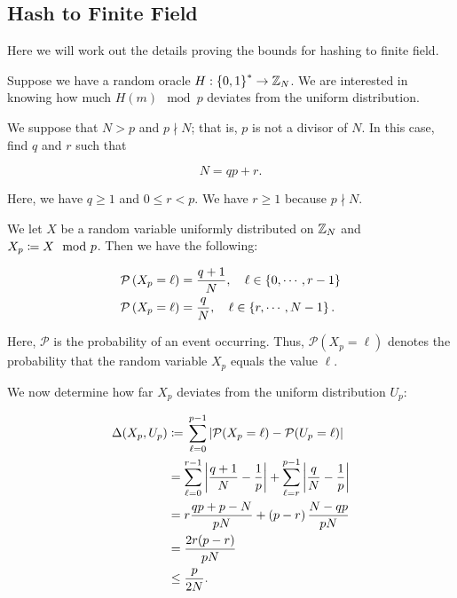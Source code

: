 \subsection{Hash to Finite Field}
\label{app:crypto_hash-to-finite-field}

Here we will work out the details proving the bounds for hashing
to \gls{finite field}.

Suppose we have a \gls{random oracle} $H:\left\{ 0,1 \right\}^{*}\to\mathbb{Z}_{N}$.
We are interested in knowing how much $H(m) \mod p$
deviates from the uniform distribution.

We suppose that $N>p$ and $p\nmid N$;
that is, $p$ is not a divisor of $N$.
In this case, find $q$ and $r$ such that

\begin{equation}
    N = qp + r.
\end{equation}

\noindent
Here, we have $q\ge1$ and $0\le r < p$.
We have $r\ge1$ because $p\nmid N$.

We let $X$ be a random variable uniformly distributed on $\mathbb{Z}_{N}$
and $X_{p} \coloneqq{} X \mod p$.
Then we have the following:

\begin{align}
    \mathcal{P}\left( X_{p} = \ell \right) &= \frac{q+1}{N},
        \quad \ell\in \left\{ 0,\cdots,r-1 \right\} \nonumber\\
    \mathcal{P}\left( X_{p} = \ell \right) &= \frac{q}{N},
        \quad \ell\in \left\{ r,\cdots,N-1 \right\}.
\end{align}

\noindent
Here, $\mathcal{P}$ is the probability of an event occurring.
Thus, $\mathcal{P}(X_{p} = \ell)$ denotes the probability
that the random variable $X_{p}$ equals the value $\ell$.

We now determine how far $X_{p}$ deviates from the uniform
distribution $U_{p}$:

\begin{align}
    \Delta(X_{p},U_{p}) &\coloneqq{}
    \sum_{\ell=0}^{p-1} \left| \mathcal{P}(X_{p}=\ell) - \mathcal{P}(U_{p}=\ell) \right|
        \nonumber\\
    &= \sum_{\ell=0}^{r-1} \left| \frac{q+1}{N} - \frac{1}{p} \right| +
        \sum_{\ell=r}^{p-1} \left| \frac{q}{N} - \frac{1}{p} \right| \nonumber\\
    &= r\frac{qp + p - N}{pN} + \left( p-r \right)\frac{N-qp}{pN}
        \nonumber\\
    &= \frac{2r(p-r)}{pN}
        \nonumber\\
    &\le \frac{p}{2N}.
\end{align}

